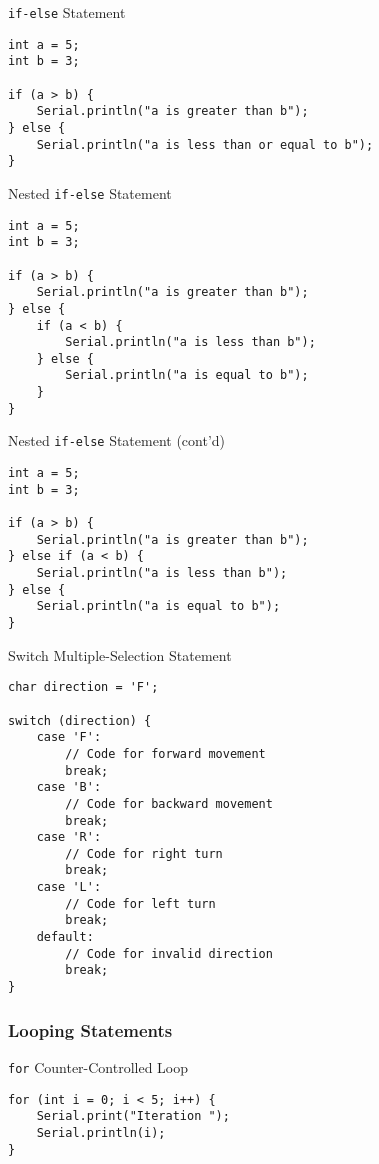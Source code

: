 \documentclass[sectionframe]{oxblue-beamer}
\begin{document}
\begin{frame}[fragile]{\texttt{if-else} Statement}
\begin{verbatim}
int a = 5;
int b = 3;

if (a > b) {
    Serial.println("a is greater than b");
} else {
    Serial.println("a is less than or equal to b");
}
\end{verbatim}
\end{frame}

\begin{frame}[fragile]{Nested \texttt{if-else} Statement}
\begin{verbatim}
int a = 5;
int b = 3;

if (a > b) {
    Serial.println("a is greater than b");
} else {
    if (a < b) {
        Serial.println("a is less than b");
    } else {
        Serial.println("a is equal to b");
    }
}
\end{verbatim}
\end{frame}

\begin{frame}[fragile]{Nested \texttt{if-else} Statement (cont'd)}
\begin{verbatim}
int a = 5;
int b = 3;

if (a > b) {
    Serial.println("a is greater than b");
} else if (a < b) {
    Serial.println("a is less than b");
} else {
    Serial.println("a is equal to b");
}
\end{verbatim}
\end{frame}

\begin{frame}[fragile]{Switch Multiple-Selection Statement}
\begin{verbatim}
char direction = 'F';

switch (direction) {
    case 'F':
        // Code for forward movement
        break;
    case 'B':
        // Code for backward movement
        break;
    case 'R':
        // Code for right turn
        break;
    case 'L':
        // Code for left turn
        break;
    default:
        // Code for invalid direction
        break;
}
\end{verbatim}
\end{frame}

\subsubsection{Looping Statements}

\begin{frame}[fragile]{\texttt{for} Counter-Controlled Loop}
\begin{verbatim}
for (int i = 0; i < 5; i++) {
    Serial.print("Iteration ");
    Serial.println(i);
}
\end{verbatim}
\end{frame}
\end{document}
